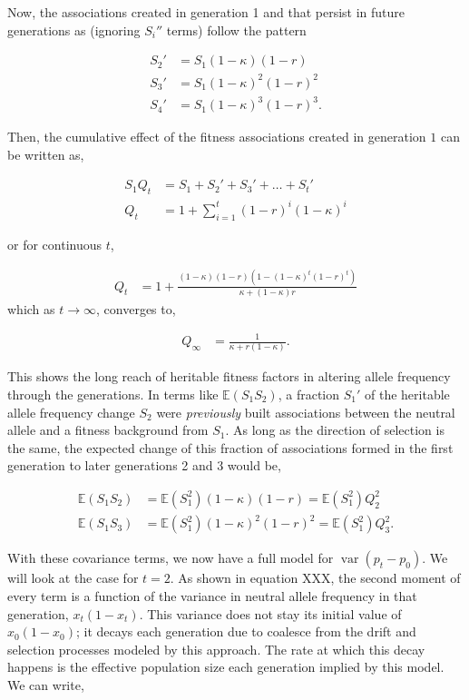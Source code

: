 \documentclass[11pt]{article}
\newcommand{\E}{\mathbb{E}}
\DeclareMathOperator{\var}{var}
\begin{document}
Now, the associations created in generation 1 and that persist in future
generations as (ignoring $S_i''$ terms) follow the pattern

\begin{align}
  S_{2}' &= S_1 (1-\kappa)(1-r) \\
  S_{3}' &= S_1 (1-\kappa)^2(1-r)^2 \\
  S_{4}' &= S_1 (1-\kappa)^3(1-r)^3.
\end{align}

Then, the cumulative effect of the fitness associations created in generation
$1$ can be written as,

\begin{align}
  \label{eq:qterm}
  S_1 Q_t &= S_1 + S_2' + S_3' + \ldots + S_t' \\
  Q_t &= 1 + \sum_{i=1}^t (1-r)^i(1-\kappa)^i
\end{align}

or for continuous $t$, 

\begin{align}
  \label{eq:q_t}
  Q_t &= 1+\frac{(1-\kappa) (1-r) \left(1-(1-\kappa)^t (1-r)^t\right)}{\kappa+(1-\kappa)r}
\end{align}
which as $t \to \infty$, converges to,

\begin{align}
  \label{eq:Qinf}
  Q_\infty &= \frac{1}{\kappa + r(1-\kappa)}.
\end{align}

This shows the long reach of heritable fitness factors in altering allele
frequency through the generations. In terms like $\E(S_1 S_2)$, a fraction
$S_1'$ of the heritable allele frequency change $S_2$ were \emph{previously}
built associations between the neutral allele and a fitness background from
$S_1$. As long as the direction of selection is the same, the expected change
of this fraction of associations formed in the first generation to later
generations 2 and 3 would be,

\begin{align}
  \E(S_1 S_2) &= \E(S_1^2) (1-\kappa)(1-r) = \E(S_1^2) Q_2^2 \\
  \E(S_1 S_3) &= \E(S_1^2) (1-\kappa)^2(1-r)^2 = \E(S_1^2) Q_3^2.
\end{align}

With these covariance terms, we now have a full model for $\var(p_t - p_0)$. We
will look at the case for $t=2$. As shown in equation XXX, the second moment of
every term is a function of the variance in neutral allele frequency in that
generation, $x_t(1-x_t)$. This variance does not stay its initial value of
$x_0(1-x_0)$; it decays each generation due to coalesce from the drift and
selection processes modeled by this approach. The rate at which this decay
happens is the effective population size each generation implied by this model. 
We can write,
\end{document}
